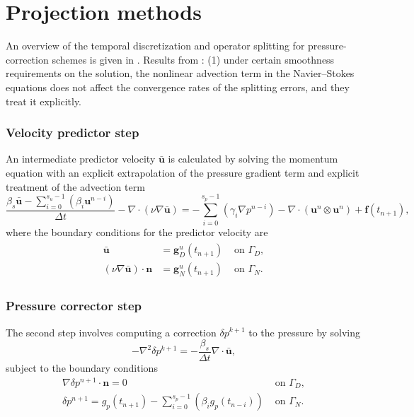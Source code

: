 \section{Projection methods}%

An overview of the temporal discretization and operator splitting for pressure-correction schemes is given in \cite{guermond_overview_2006}. Results from \cite{guermond_overview_2006}: (1) under certain smoothness requirements on the solution, the nonlinear advection term in the Navier--Stokes equations does not affect the convergence rates of the splitting errors, and they treat it explicitly. 

\subsubsection{Velocity predictor step}
An intermediate predictor velocity $\bar{\bm{u}}$ is calculated by solving the momentum equation with an explicit extrapolation of the pressure gradient term and explicit treatment of the advection term
\begin{equation}
\frac{ \beta_s \bar{\bm{u}} - \sum_{i=0}^{s_u-1}\left(\beta_i \bm{u}^{n-i}\right) }{\Delta t} 
- \nabla \cdot \left(\nu \nabla \bar{\bm{u}}\right) 
= - \sum_{i=0}^{s_p-1}\left(\gamma_i\nabla p^{n-i}\right) 
- \nabla \cdot \left(\bm{u}^n\otimes \bm{u}^n\right) 
+ \bm{f}(t_{n+1}),
\label{eq:PDE_velocity_predictor}
\end{equation}
where the boundary conditions for the predictor velocity are 
\begin{align}
  \begin{aligned}
  \bar{\bm{u}} &= \bm{g}_D^u(t_{n+1}) & \text{ on } \Gamma_D, \\
  \left(\nu \nabla \bar{\bm{u}}\right) \cdot \bm{n} &= \bm{g}_N^u(t_{n+1}) & \text{ on } \Gamma_N.
  \end{aligned}
  \label{eq:VP_BCs}
\end{align}

\subsubsection{Pressure corrector step}
The second step involves computing a correction $\delta p^{k+1}$ to the pressure by solving 
\begin{equation}
  -\nabla^2 \delta p^{k+1} = - \frac{\beta_s}{\Delta t} \nabla \cdot \bar{\bm{u}},
  \label{eq:PC_presure_poisson}
\end{equation}
subject to the boundary conditions
\begin{eqnarray}
    \nabla \delta p^{n+1} \cdot \bm{n} = 0 & \text{ on } \Gamma_D, \\
    \delta p^{n+1} = g_p(t_{n+1}) 
    - \sum_{i=0}^{s_p-1}\left(\beta_i g_p(t_{n-i})\right) & \text{ on }  \Gamma_N.
\label{eq:PDE_pressure_corrector}
\end{eqnarray}

